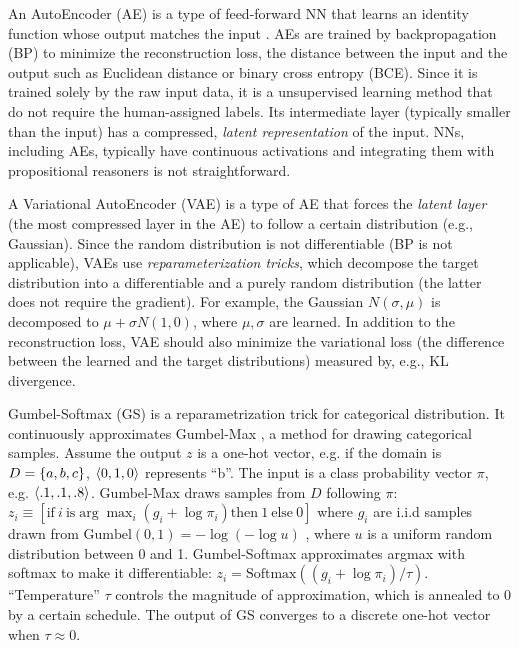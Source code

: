 An AutoEncoder (AE) is a type of feed-forward NN that learns
an identity function whose output matches the input \cite{hinton2006reducing}.
AEs are trained by backpropagation (BP) to minimize the reconstruction loss,
the distance between the input and the output such as Euclidean distance or binary cross entropy (BCE).
Since it is trained solely by the raw input data, it is a unsupervised learning method that do not require the human-assigned labels.
Its intermediate layer (typically smaller than the input) has a compressed, \emph{latent representation} of the input.
NNs, including AEs, typically have continuous activations and integrating them with propositional reasoners is not straightforward.

A Variational AutoEncoder (VAE) \cite{kingma2013auto} is a type of AE that forces the \emph{latent layer} (the most compressed layer in the AE) to follow a certain distribution (e.g., Gaussian).
Since the random distribution is not differentiable (BP is not applicable), VAEs use \emph{reparameterization tricks}, which decompose the target distribution into a differentiable and a purely random distribution (the latter does not require the gradient).
For example, the Gaussian $N(\sigma,\mu)$ is decomposed to $\mu+\sigma N(1,0)$, where $\mu,\sigma$ are learned.
In addition to the reconstruction loss, VAE should also minimize the variational loss (the difference between the learned and the target distributions) measured by, e.g.,  KL divergence.

Gumbel-Softmax (GS) is a reparametrization trick \cite{jang2016categorical} for categorical distribution.
It continuously approximates Gumbel-Max \cite{maddison2014sampling}, a method for drawing categorical samples.
Assume the output $z$ is a one-hot vector, e.g. if the domain is $D={\left\{a,b,c\right\}}$, ${\left<0,1,0\right>}$ represents ``b''.
The input is a class probability vector $\pi$, e.g. ${\left<.1,.1,.8\right>}$.
Gumbel-Max draws samples from $D$ following $\pi$:
 $z_i \equiv [ \text{if}\ i\ \text{is} \arg \max_i (g_i+\log \pi_i) \text{then}\ 1\ \text{else}\ 0 ]$
where $g_i$ are i.i.d samples drawn from
 $\text{Gumbel}(0,1) =-\log (-\log u)$ \cite{gumbel1954statistical}, where
$u$ is a uniform random distribution between 0 and 1.
Gumbel-Softmax approximates argmax with softmax to make it differentiable:
$z_i = \text{Softmax}((g_i+\log \pi_i)/\tau)$.
``Temperature'' $\tau$ controls the magnitude of approximation, which is annealed to 0 by a certain schedule.
The output of GS converges to a discrete one-hot vector when $\tau\approx 0$.

